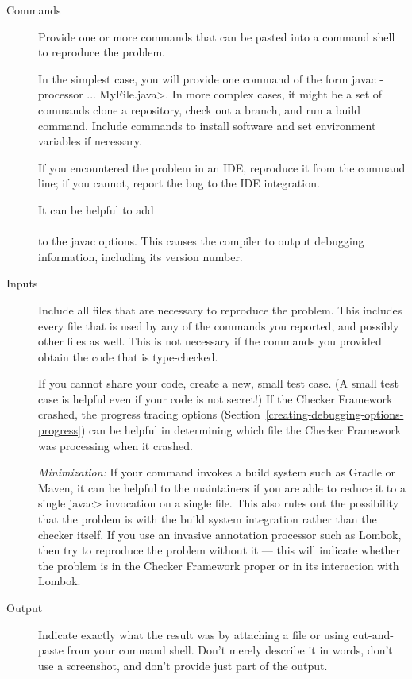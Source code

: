 \begin{description}
\item[Commands]
  Provide one or more commands that can be pasted into a command shell to
  reproduce the problem.

  In the simplest case, you will provide one command of
  the form \<javac -processor ... MyFile.java>.  In more complex cases, it
  might be a set of commands clone a repository, check out a branch, and
  run a build command.  Include commands to install software and set
  environment variables if necessary.

  If you encountered the problem in an IDE, reproduce it from the command
  line; if you cannot, report the bug to the IDE integration.

  It can be helpful to add \\
   \\
  to the javac options.  This causes the
  compiler to output debugging information, including its version number.

\item[Inputs]
  Include all files that are necessary to reproduce the problem.  This
  includes every file that is used by any of the commands you reported, and
  possibly other files as well.  This is not necessary if the commands you
  provided obtain the code that is type-checked.

  If you cannot share your code, create a new, small test case.  (A small
  test case is helpful even if your code is not secret!)  If the Checker
  Framework crashed, the progress tracing options
  (Section~\ref{creating-debugging-options-progress}) can be helpful in
  determining which file the Checker Framework was processing when it
  crashed.

  \emph{Minimization:}
  If your command invokes a build system such as Gradle or Maven, it can be
  helpful to the maintainers if you are able to reduce it to a single
  \<javac> invocation on a single file.
  This also rules out the possibility that the problem is with the build system
  integration rather than the checker itself.
  If you use an invasive
  annotation processor such as Lombok, then try to reproduce the problem
  without it --- this will indicate whether the problem is in the Checker
  Framework proper or in its interaction with Lombok.

\item[Output]
  Indicate exactly what the result was by attaching a file or using
  cut-and-paste from your command shell.  Don't merely describe it in
  words, don't use a screenshot, and don't provide just part of the output.


\end{description}
